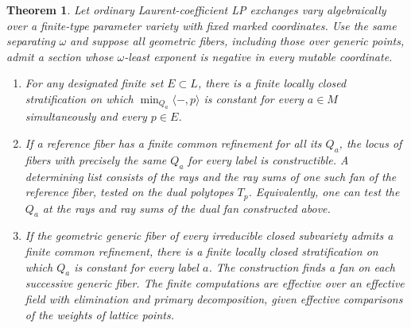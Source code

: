 \documentclass[11pt,reqno]{amsart}
\numberwithin{equation}{section}
\newtheorem{theorem}{Theorem}[section]
\theoremstyle{definition}
\theoremstyle{remark}
\begin{document}
\begin{theorem}\label{thm:source-family-direction-strata}
Let ordinary Laurent-coefficient LP exchanges vary algebraically over
a finite-type parameter variety with fixed marked coordinates. Use
the same separating \(\omega\) and suppose all geometric fibers,
including those over generic points, admit a section whose
\(\omega\)-least exponent is negative in every mutable coordinate.
\begin{enumerate}
\item For any designated finite set \(E\subset L\), there is a finite
locally closed stratification on which
\(\min_{Q_a}\langle -,p\rangle\) is constant for every \(a\in M\)
simultaneously and every \(p\in E\).
\item If a reference fiber has a finite common refinement for all its
\(Q_a\), the locus of fibers with precisely the same \(Q_a\) for every
label is constructible. A determining list consists of the rays and
the ray sums of one such fan of the reference fiber, tested on the
dual polytopes \(T_p\). Equivalently, one can test the \(Q_a\) at
the rays and ray sums of the dual fan constructed above.
\item If the geometric generic fiber of every irreducible closed
subvariety admits a finite common refinement, there is a finite
locally closed stratification on which \(Q_a\) is constant for every
label \(a\). The construction finds a fan on each successive generic fiber. The finite computations are effective over an effective field
with elimination and primary decomposition, given effective comparisons
of the weights of lattice points.
\end{enumerate}
\end{theorem}
\end{document}
